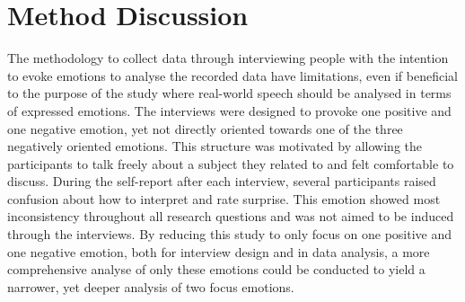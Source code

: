 \section{Method Discussion}

The methodology to collect data through interviewing people with the intention to evoke emotions to analyse the recorded data have limitations, even if beneficial to the purpose of the study where real-world speech should be analysed in terms of expressed emotions. The interviews were designed to provoke one positive and one negative emotion, yet not directly oriented towards one of the three negatively oriented emotions. This structure was motivated by allowing the participants to talk freely about a subject they related to and felt comfortable to discuss. During the self-report after each interview, several participants raised confusion about how to interpret and rate surprise. This emotion showed most inconsistency throughout all research questions and was not aimed to be induced through the interviews. By reducing this study to only focus on one positive and one negative emotion, both for interview design and in data analysis, a more comprehensive analyse of only these emotions could be conducted to yield a narrower, yet deeper analysis of two focus emotions. 

